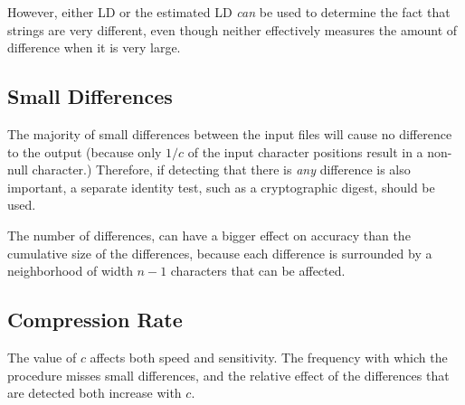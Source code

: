 \documentclass[html]{article}    %
\begin{document}
However, either LD or the estimated LD {\em can } be used to determine the fact
that strings are very different, even though neither effectively measures the amount of 
difference when it is very large.

\subsection{Small Differences }
The majority of small differences between the input files will cause no difference to the output
(because only $1/c$ of the input character positions result in a  non-null character.) 
Therefore, if detecting that there is {\em any} difference is also important, a
separate identity test, such as a cryptographic digest, should be used.

The number of differences, can have a bigger effect on accuracy than the
cumulative size of the differences, because each difference is surrounded by
a neighborhood of width $n-1$ characters that can be affected.

\subsection{Compression Rate}
The value of $c$ affects both speed and sensitivity.  
The frequency with which  the procedure misses small differences, and the
relative effect of the differences that are detected both increase with $c$.
\end{document}
